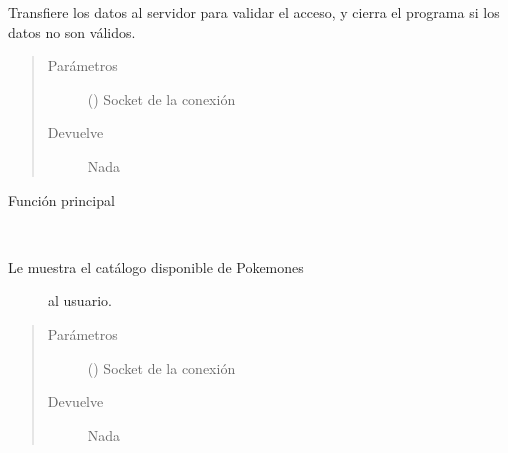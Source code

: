 \documentclass[letterpaper,10pt,spanish,openany,oneside]{sphinxmanual}
\begin{document}

\begin{fulllineitems}
\label{\detokenize{pokemonClient:pokemonClient.login}}
Transfiere los datos al servidor para validar el acceso, y cierra el programa si los datos no son válidos.
\begin{quote}\begin{description}
\item[{Parámetros}] \leavevmode
{} () \textendash{} Socket de la conexión

\item[{Devuelve}] \leavevmode
Nada

\end{description}\end{quote}

\end{fulllineitems}


\begin{fulllineitems}
\label{\detokenize{pokemonClient:pokemonClient.main}}
Función principal

\end{fulllineitems}


\begin{fulllineitems}
\label{\detokenize{pokemonClient:pokemonClient.muestraCatalogo}}~\begin{description}
\item[{Le muestra el catálogo disponible de Pokemones}] \leavevmode
al usuario.

\end{description}
\begin{quote}\begin{description}
\item[{Parámetros}] \leavevmode
{} () \textendash{} Socket de la  conexión

\item[{Devuelve}] \leavevmode
Nada

\end{description}\end{quote}

\end{fulllineitems}
\end{document}
